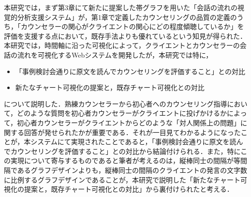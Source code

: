 \documentclass[shuuron]{kuee}
\begin{document}
本研究では，まず第3章にて新たに提案した帯グラフを用いた「会話の流れの視覚的分析支援システム」が，第1章で定義したカウンセリングの品質の定義のうち，「カウンセラーの関心がクライエントの関心にどの程度傾聴しているか」を評価を支援する点において，既存手法よりも優れているという知見が得られた．本研究では，時間軸に沿った可視化によって，クライエントとカウンセラーの会話の流れを可視化するWebシステムを開発したが，本研究では特に，
\begin{itemize}
  \item 「事例検討会通りに原文を読んでカウンセリングを評価すること」との対比
  \item 新たなチャート可視化の提案と，既存チャート可視化との対比
\end{itemize}
について説明した．熟練カウンセラーから初心者へのカウンセリング指導において，どのような質問を初心者カウンセラーがクライエントに投げかけるかによって，初心者カウンセラーがクライエントからどのような「対人関係上の問題」に関する回答が発せられたかが重要である．それが一目見てわかるようになったことが，本システムにて実現されたことであると，「事例検討会通りに原文を読んでカウンセリングを評価すること」との対比から結論付けられる．また，特にこの実現について寄与するものであると筆者が考えるのは，縦棒同士の間隔が等間隔であるグラフデザインよりも，縦棒同士の間隔のクライエントの発言の文字数に比例するグラフデザインであることが，本研究で説明した「新たなチャート可視化の提案と，既存チャート可視化との対比」から裏付けられたと考える．





\end{document}
